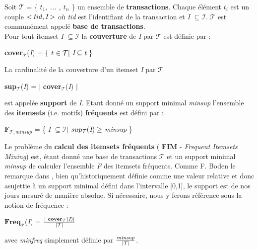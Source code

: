 \documentclass[a4paper,10pt]{report}
\begin{document}
\hspace{0.15cm}Soit $\mathcal{T}$ = \{ \emph{$t_{1}$, ... , $t_{n}$ } \} un ensemble de \textbf{transactions}. Chaque élément \emph{$t_{i}$} est un couple $< tid, \emph{I} >$ où \emph{tid} est l'identifiant de la transaction et \emph{I} $\subseteq \mathcal{I}$. $\mathcal{T}$ est communément appelé \textbf{base de transactions}.  \\

\hspace{0.15cm}Pour tout itemset \emph{I} $\subseteq \mathcal{I}$ la \textbf{couverture} de \emph{I} par $\mathcal{T}$ est définie par : \\
\begin{center}
\textbf{cover$_{\mathcal{T}}$}(\emph{I}) = \{ \emph{t} $\in \mathcal{T}  | \emph{ I} \subseteq \emph{t }\}$
\end{center}

\hspace{0.15cm}La cardinalité de la couverture d'un itemset \emph{I} par $\mathcal{T}$ \\
\begin{center}
\textbf{sup$_{\mathcal{T}}$}(\emph{I}) = $|$ \textbf{cover$_{\mathcal{T}}$}(\emph{I}) $|$
\end{center}
est appelée \textbf{support} de \emph{I}.  Etant donné un support minimal \emph{minsup} l'ensemble des \textbf{itemsets} (i.e. motifs) \textbf{fréquents} est défini par : \\
\begin{center}
$\textbf{F}_{\mathcal{T},minsup}$ = \{ \emph{I} $\subseteq \mathcal{I } |$  $sup_{\mathcal{T}}(\emph{I}) \geq$ \emph{minsup} \}
\end{center}

\hspace{0.15cm}Le problème du \textbf{calcul des itemsets fréquents} ( \textbf{FIM} - \emph{Frequent Itemsets Mining}) est, étant donné une base de transactions $\mathcal{T}$ et un support minimal \emph{minsup} de calculer l'ensemble \emph{F} des itemsets fréquents. Comme F. Boden le remarque dans \cite{BOD06}, bien qu'historiquement définie comme une valeur relative et donc asujettie à un support minimal défini dans l'intervalle [0,1], le support est de nos jours mesuré de manière absolue. Si nécessaire, nous y ferons référence sous la notion de fréquence : \\
\begin{center}
$\textbf{Freq}_{\mathcal{T}}$(\emph{I}) = $\frac{ | \textbf{ cover$_{\mathcal{T}}$}(\emph{I})  | } { | \mathcal{T} | }$
\end{center}
avec \emph{minfreq} simplement définie par $\frac{\emph{minsup}}{| \mathcal{T} |}$. \\
\end{document}
